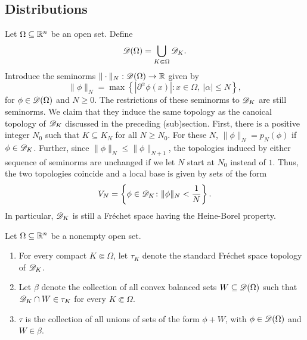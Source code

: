 \subsection{Distributions}
Let $\Omega\subseteq\mathbb{R}^n$ be an open set. Define
\begin{equation*}
    \mathscr{D}(\Omega) = \bigcup_{K\Subset\Omega}\mathscr{D}_K.
\end{equation*}
Introduce the seminorms $\|\cdot\|_N: \mathscr{D}(\Omega)\to\mathbb{R}$ given by 
\begin{equation*}
    \|\phi\|_N = \max\left\{|\partial^\alpha\phi(x)|\colon x\in\Omega,~|\alpha|\le N\right\},
\end{equation*}
for $\phi\in\mathscr{D}(\Omega)$ and $N\ge 0$. The restrictions of these seminorms to $\mathscr{D}_K$ are still seminorms. We claim that they induce the same topology as the canoical topology of $\mathscr{D}_K$ discussed in the preceding (sub)section. First, there is a positive integer $N_0$ such that $K\subseteq K_N$ for all $N\ge N_0$. For these $N$, $\|\phi\|_N = p_N(\phi)$ if $\phi\in\mathscr{D}_K$. Further, since $\|\phi\|_N\le\|\phi\|_{N + 1}$, the topologies induced by either sequence of seminorms are unchanged if we let $N$ start at $N_0$ instead of $1$. Thus, the two topologies coincide and a local base is given by sets of the form 
\begin{equation*}
    V_N = \left\{\phi\in\mathscr{D}_K\colon\|\phi\|_N < \frac{1}{N}\right\}.
\end{equation*}
In particular, $\mathscr{D}_K$ is still a Fr\'echet space having the Heine-Borel property.

\begin{definition}
    Let $\Omega\subseteq\mathbb{R}^n$ be a nonempty open set.
    \begin{enumerate}[label=(\alph*)]
        \item For every compact $K\Subset\Omega$, let $\tau_K$ denote the standard Fr\'echet space topology of $\mathscr{D}_K$. 
        \item Let $\beta$ denote the collection of all convex balanced sets $W\subseteq\mathscr{D}(\Omega)$ such that $\mathscr{D}_K\cap W\in\tau_K$ for every $K\Subset\Omega$.
        \item $\tau$ is the collection of all unions of sets of the form $\phi + W$, with $\phi\in\mathscr{D}(\Omega)$ and $W\in\beta$.
    \end{enumerate}
\end{definition}

